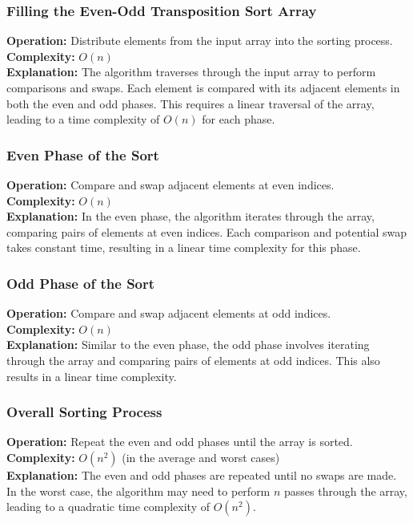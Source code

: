 \subsubsection{Filling the Even-Odd Transposition Sort Array}
\textbf{Operation:} Distribute elements from the input array into the sorting process. \\
\textbf{Complexity:} $O(n)$ \\
\textbf{Explanation:} The algorithm traverses through the input array to perform comparisons and swaps. Each element is compared with its adjacent elements in both the even and odd phases. This requires a linear traversal of the array, leading to a time complexity of $O(n)$ for each phase.

\subsubsection{Even Phase of the Sort}
\textbf{Operation:} Compare and swap adjacent elements at even indices. \\
\textbf{Complexity:} $O(n)$ \\
\textbf{Explanation:} In the even phase, the algorithm iterates through the array, comparing pairs of elements at even indices. Each comparison and potential swap takes constant time, resulting in a linear time complexity for this phase.

\subsubsection{Odd Phase of the Sort}
\textbf{Operation:} Compare and swap adjacent elements at odd indices. \\
\textbf{Complexity:} $O(n)$ \\
\textbf{Explanation:} Similar to the even phase, the odd phase involves iterating through the array and comparing pairs of elements at odd indices. This also results in a linear time complexity.

\subsubsection{Overall Sorting Process}
\textbf{Operation:} Repeat the even and odd phases until the array is sorted. \\
\textbf{Complexity:} $O(n^2)$ (in the average and worst cases) \\
\textbf{Explanation:} The even and odd phases are repeated until no swaps are made. In the worst case, the algorithm may need to perform $n$ passes through the array, leading to a quadratic time complexity of $O(n^2)$.

